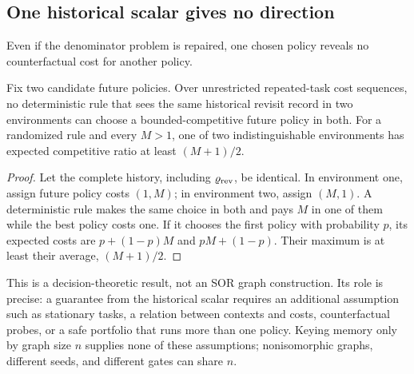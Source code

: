 \subsection{One historical scalar gives no direction}

Even if the denominator problem is repaired, one chosen policy reveals no
counterfactual cost for another policy.

\begin{proposition}
\label{prop:nonidentify}
Fix two candidate future policies.  Over unrestricted repeated-task cost
sequences, no deterministic rule that sees the same historical revisit
record in two environments can choose a bounded-competitive future policy in
both.  For a randomized rule and every $M>1$, one of two indistinguishable
environments has expected competitive ratio at least $(M+1)/2$.
\end{proposition}

\begin{proof}
Let the complete history, including $\varrho_{\rm rev}$, be identical.  In
environment one, assign future policy costs $(1,M)$; in environment two,
assign $(M,1)$.  A deterministic rule makes the same choice in both and pays
$M$ in one of them while the best policy costs one.  If it chooses the first
policy with probability $p$, its expected costs are
$p+(1-p)M$ and $pM+(1-p)$.  Their maximum is at least their average,
$(M+1)/2$.
\end{proof}

This is a decision-theoretic result, not an SOR graph construction.  Its role
is precise: a guarantee from the historical scalar requires an additional
assumption such as stationary tasks, a relation between contexts and costs,
counterfactual probes, or a safe portfolio that runs more than one policy.
Keying memory only by graph size $n$ supplies none of these assumptions;
nonisomorphic graphs, different seeds, and different gates can share $n$.
